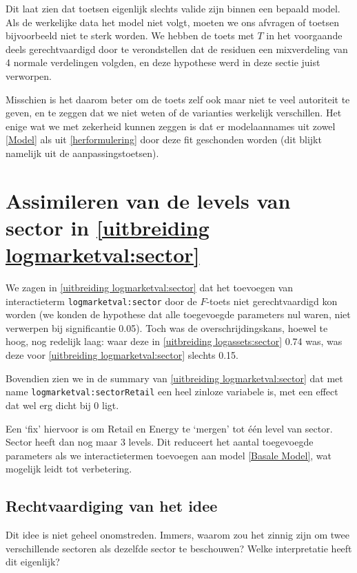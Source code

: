 \documentclass[a4paper]{report}
\begin{document}
  Dit laat zien dat toetsen eigenlijk slechts valide zijn binnen een bepaald model. Als de werkelijke data het model niet volgt, moeten we ons afvragen of toetsen bijvoorbeeld niet te sterk worden. We hebben de toets met $T$ in het voorgaande deels gerechtvaardigd door te verondstellen dat de residuen een mixverdeling van 4 normale verdelingen volgden, en deze hypothese werd in deze sectie juist verworpen. 
  
  Misschien is het daarom beter om de toets zelf ook maar niet te veel autoriteit te geven, en te zeggen dat we niet weten of de varianties werkelijk verschillen. Het enige wat we met zekerheid kunnen zeggen is dat er modelaannames uit zowel \ref{Model} als uit \ref{herformulering} door deze fit geschonden worden (dit blijkt namelijk uit de aanpassingstoetsen).
  
\chapter{Assimileren van de levels van sector in \ref{uitbreiding logmarketval:sector}}

  We zagen in \ref{uitbreiding logmarketval:sector} dat het toevoegen van interactieterm \verb!logmarketval:sector! door de $F$-toets niet gerechtvaardigd kon worden (we konden de hypothese dat alle toegevoegde parameters nul waren, niet verwerpen bij significantie 0.05). Toch was de overschrijdingskans, hoewel te hoog, nog redelijk laag: waar deze in \ref{uitbreiding logassets:sector} 0.74 was, was deze voor \ref{uitbreiding logmarketval:sector} slechts 0.15. 

  Bovendien zien we in de summary van \ref{uitbreiding logmarketval:sector} dat met name \verb!logmarketval:sectorRetail! een heel zinloze variabele is, met een effect dat wel erg dicht bij 0 ligt.
  
  Een `fix' hiervoor is om Retail en Energy te `mergen' tot \' e\' en level van sector. Sector heeft dan nog maar 3 levels. Dit reduceert het aantal toegevoegde parameters als we interactietermen toevoegen aan model \ref{Basale Model}, wat mogelijk leidt tot verbetering.
  
\section{Rechtvaardiging van het idee}

  Dit idee is niet geheel onomstreden. Immers, waarom zou het zinnig zijn om twee verschillende sectoren als dezelfde sector te beschouwen? Welke interpretatie heeft dit eigenlijk?
  
\end{document}
